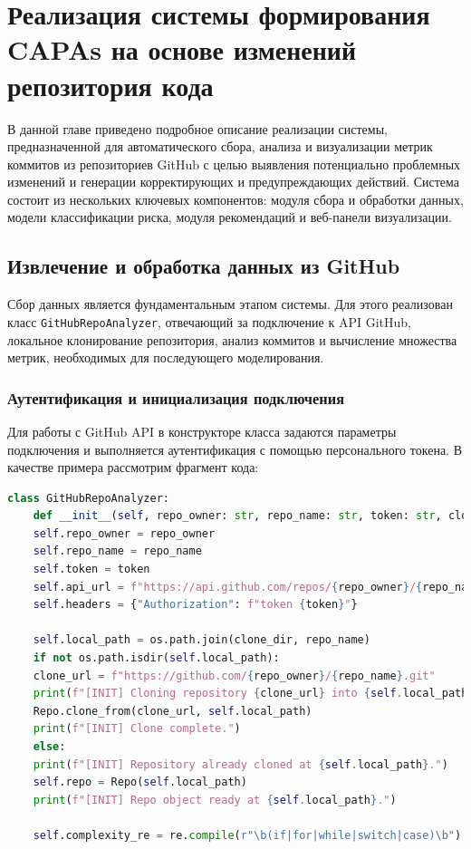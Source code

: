 \chapter{Реализация системы формирования CAPAs на основе изменений репозитория кода} \label{ch3}

В данной главе приведено подробное описание реализации системы, предназначенной для автоматического сбора, анализа и визуализации метрик коммитов из репозиториев GitHub с целью выявления потенциально проблемных изменений и генерации корректирующих и предупреждающих действий. Система состоит из нескольких ключевых компонентов: модуля сбора и обработки данных, модели классификации риска, модуля рекомендаций и веб-панели визуализации.

\section{Извлечение и обработка данных из GitHub} \label{ch3:sec2}

Сбор данных является фундаментальным этапом системы. Для этого реализован класс \texttt{GitHubRepoAnalyzer}, отвечающий за подключение к API GitHub, локальное клонирование репозитория, анализ коммитов и вычисление множества метрик, необходимых для последующего моделирования.

\subsection{Аутентификация и инициализация подключения}

Для работы с GitHub API в конструкторе класса задаются параметры подключения и выполняется аутентификация с помощью персонального токена. В качестве примера рассмотрим фрагмент кода:

\begin{lstlisting}[language=Python, caption={{Поля класса \texttt{GitHubRepoAnalyzer}}}]
	class GitHubRepoAnalyzer:
	def __init__(self, repo_owner: str, repo_name: str, token: str, clone_dir: str = "/tmp"):
	self.repo_owner = repo_owner
	self.repo_name = repo_name
	self.token = token
	self.api_url = f"https://api.github.com/repos/{repo_owner}/{repo_name}"
	self.headers = {"Authorization": f"token {token}"}
	
	self.local_path = os.path.join(clone_dir, repo_name)
	if not os.path.isdir(self.local_path):
	clone_url = f"https://github.com/{repo_owner}/{repo_name}.git"
	print(f"[INIT] Cloning repository {clone_url} into {self.local_path}")
	Repo.clone_from(clone_url, self.local_path)
	print(f"[INIT] Clone complete.")
	else:
	print(f"[INIT] Repository already cloned at {self.local_path}.")
	self.repo = Repo(self.local_path)
	print(f"[INIT] Repo object ready at {self.local_path}.")
	
	self.complexity_re = re.compile(r"\b(if|for|while|switch|case)\b")
\end{lstlisting}

